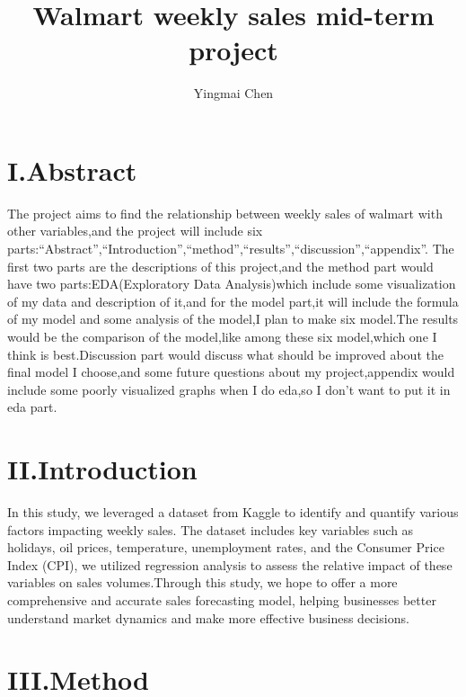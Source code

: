 \documentclass[
  letterpaper,
  DIV=11,
  numbers=noendperiod]{scrartcl}
\title{Walmart weekly sales mid-term project}
\author{Yingmai Chen}
\date{}
\begin{document}
\maketitle
\ifdefined\Shaded\renewenvironment{Shaded}{\begin{tcolorbox}[frame hidden, sharp corners, boxrule=0pt, borderline west={3pt}{0pt}{shadecolor}, interior hidden, breakable, enhanced]}{\end{tcolorbox}}\fi

\hypertarget{i.abstract}{%
\section{I.Abstract}\label{i.abstract}}

The project aims to find the relationship between weekly sales of
walmart with other variables,and the project will include six
parts:``Abstract'',``Introduction'',``method'',``results'',``discussion'',``appendix''.
The first two parts are the descriptions of this project,and the method
part would have two parts:EDA(Exploratory Data Analysis)which include
some visualization of my data and description of it,and for the model
part,it will include the formula of my model and some analysis of the
model,I plan to make six model.The results would be the comparison of
the model,like among these six model,which one I think is
best.Discussion part would discuss what should be improved about the
final model I choose,and some future questions about my project,appendix
would include some poorly visualized graphs when I do eda,so I don't
want to put it in eda part.

\hypertarget{ii.introduction}{%
\section{II.Introduction}\label{ii.introduction}}

In this study, we leveraged a dataset from Kaggle to identify and
quantify various factors impacting weekly sales. The dataset includes
key variables such as holidays, oil prices, temperature, unemployment
rates, and the Consumer Price Index (CPI), we utilized regression
analysis to assess the relative impact of these variables on sales
volumes.Through this study, we hope to offer a more comprehensive and
accurate sales forecasting model, helping businesses better understand
market dynamics and make more effective business decisions.

\hypertarget{iii.method}{%
\section{III.Method}\label{iii.method}}
\end{document}
